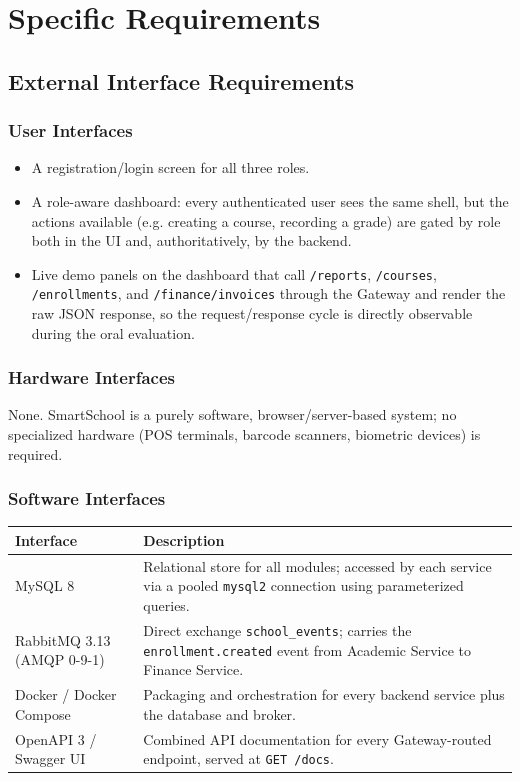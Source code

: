 \documentclass[11pt,a4paper]{report}
\newcommand{\sysname}{SmartSchool}
\begin{document}
\chapter{Specific Requirements}

\section{External Interface Requirements}

\subsection{User Interfaces}
\begin{itemize}[itemsep=2pt]
    \item A registration/login screen for all three roles.
    \item A role-aware dashboard: every authenticated user sees the same shell, but the actions available (e.g. creating a course, recording a grade) are gated by role both in the UI and, authoritatively, by the backend.
    \item Live demo panels on the dashboard that call \texttt{/reports}, \texttt{/courses}, \texttt{/enrollments}, and \texttt{/finance/invoices} through the Gateway and render the raw JSON response, so the request/response cycle is directly observable during the oral evaluation.
\end{itemize}

\subsection{Hardware Interfaces}
None. \sysname{} is a purely software, browser/server-based system; no
specialized hardware (POS terminals, barcode scanners, biometric devices) is
required.

\subsection{Software Interfaces}
\begin{longtable}{L{3.6cm} L{10.4cm}}
\toprule
\textbf{Interface} & \textbf{Description} \\
\midrule
\endhead
MySQL 8 & Relational store for all modules; accessed by each service via a pooled \texttt{mysql2} connection using parameterized queries. \\
RabbitMQ 3.13 (AMQP 0-9-1) & Direct exchange \texttt{school\_events}; carries the \texttt{enrollment.created} event from Academic Service to Finance Service. \\
Docker / Docker Compose & Packaging and orchestration for every backend service plus the database and broker. \\
OpenAPI 3 / Swagger UI & Combined API documentation for every Gateway-routed endpoint, served at \texttt{GET /docs}. \\
\bottomrule
\end{longtable}
\end{document}
